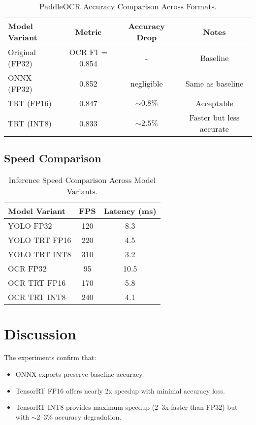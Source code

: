 \documentclass[12pt,a4paper]{article}
\begin{document}
\begin{table}[H]
\centering
\begin{tabular}{lccc}
\toprule
Model Variant & Metric & Accuracy Drop & Notes \\
\midrule
Original (FP32) & OCR F1 = 0.854 & - & Baseline \\
ONNX (FP32)     & 0.852 & negligible & Same as baseline \\
TRT (FP16)      & 0.847 & $\sim0.8\%$ & Acceptable \\
TRT (INT8)      & 0.833 & $\sim2.5\%$ & Faster but less accurate \\
\bottomrule
\end{tabular}
\caption{PaddleOCR Accuracy Comparison Across Formats.}
\end{table}

\subsection{Speed Comparison}
\begin{table}[H]
\centering
\begin{tabular}{lcc}
\toprule
Model Variant & FPS & Latency (ms) \\
\midrule
YOLO FP32 & 120 & 8.3 \\
YOLO TRT FP16 & 220 & 4.5 \\
YOLO TRT INT8 & 310 & 3.2 \\
\midrule
OCR FP32 & 95 & 10.5 \\
OCR TRT FP16 & 170 & 5.8 \\
OCR TRT INT8 & 240 & 4.1 \\
\bottomrule
\end{tabular}
\caption{Inference Speed Comparison Across Model Variants.}
\end{table}

\section{Discussion}
The experiments confirm that:
\begin{itemize}
    \item ONNX exports preserve baseline accuracy.  
    \item TensorRT FP16 offers nearly 2x speedup with minimal accuracy loss.  
    \item TensorRT INT8 provides maximum speedup (2--3x faster than FP32) but with $\sim$2--3\% accuracy degradation.  
\end{itemize}
\end{document}
